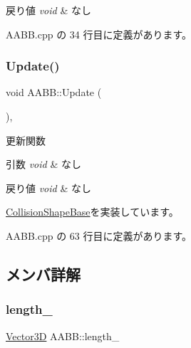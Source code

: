 \begin{DoxyRetVals}{戻り値}
{\em void} & なし \\
\hline
\end{DoxyRetVals}


 A\+A\+B\+B.\+cpp の 34 行目に定義があります。

\mbox{\label{class_a_a_b_b_a0a96be8dec3969d893bf90d3f05e22b7}} 
\subsubsection{\texorpdfstring{Update()}{Update()}}
{\footnotesize\ttfamily void A\+A\+B\+B\+::\+Update (\begin{DoxyParamCaption}{ }\end{DoxyParamCaption})\hspace{0.3cm}{\ttfamily [override]}, {\ttfamily [virtual]}}



更新関数 


\begin{DoxyParams}{引数}
{\em void} & なし \\
\hline
\end{DoxyParams}

\begin{DoxyRetVals}{戻り値}
{\em void} & なし \\
\hline
\end{DoxyRetVals}


\mbox{\hyperlink{class_collision_shape_base_a7aaa0f4de4e208f168f78e3445313929}{Collision\+Shape\+Base}}を実装しています。



 A\+A\+B\+B.\+cpp の 63 行目に定義があります。



\subsection{メンバ詳解}
\mbox{\label{class_a_a_b_b_abade307dbbfa9c74638fde5387d629f8}} 
\subsubsection{\texorpdfstring{length\+\_\+}{length\_}}
{\footnotesize\ttfamily \mbox{\hyperlink{class_vector3_d}{Vector3D}} A\+A\+B\+B\+::length\+\_\+\hspace{0.3cm}{\ttfamily [private]}}



